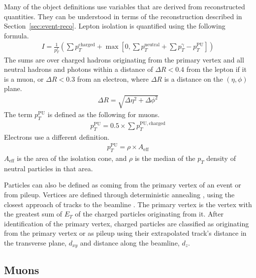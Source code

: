 Many of the object definitions use variables that are derived from reconstructed quantities.
They can be understood in terms of the reconstruction
described in Section~\ref{sec:event-reco}.
Lepton isolation is quantified using the following formula.
\begin{gather}
  I = \frac{1}{p_T^\ell} \left(\sum p_T^\mathrm{charged} +
      \max\left[0, \sum p_T^\mathrm{neutral} +
               \sum p_T^\mathrm{\gamma} - p_T^\mathrm{PU}
               \right]\right) \label{eq:isolation}
\end{gather}
The sums are over charged hadrons originating from the primary vertex
and all neutral hadrons and photons within a distance of $\Delta R < 0.4$
from the lepton if it is a muon, or $\Delta R < 0.3$ from an electron,
where $\Delta R$ is a distance on the $(\eta, \phi)$ plane.
\begin{gather}
  \Delta R = \sqrt{\Delta\eta^2 + \Delta\phi^2}
\end{gather}
The term $p_T^\mathrm{PU}$ is defined as the following for muons.
\begin{gather}
  p_T^\mathrm{PU} = 0.5 \times \sum p_T^{\mathrm{PU}, \mathrm{charged}}
\end{gather}
Electrons use a different definition.
\begin{gather}
  p_T^\mathrm{PU} = \rho \times A_\mathrm{eff}
\end{gather}
$A_\mathrm{eff}$ is the area of the isolation cone,
and $\rho$ is the median of the $p_T$ density of neutral particles in that area.

Particles can also be defined as coming from the primary vertex of an event or from pileup.
Vertices are defined through deterministic annealing \cite{726788},
using the closest approach of tracks to the beamline \cite{Collaboration_2014}.
The primary vertex is the vertex with
the greatest sum of $E_T$ of the charged particles originating from it.
After identification of the primary vertex,
charged particles are classified as originating from the primary vertex or as pileup
using their extrapolated track's distance in the transverse plane, $d_{xy}$
and distance along the beamline, $d_z$.

\subsection{Muons} \label{sec:muon-def}

